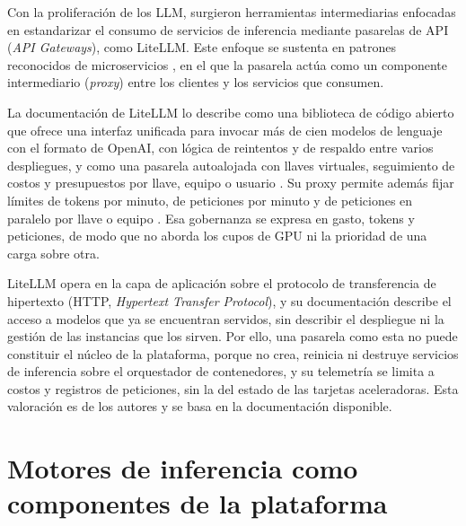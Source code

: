 Con la proliferación de los LLM, surgieron herramientas intermediarias enfocadas en estandarizar el consumo de servicios de inferencia mediante pasarelas de API (\emph{API Gateways}), como LiteLLM. Este enfoque se sustenta en patrones reconocidos de microservicios \citep{montesi-apigatewaypatterns-2016}, en el que la pasarela actúa como un componente intermediario (\emph{proxy}) entre los clientes y los servicios que consumen.

La documentación de LiteLLM lo describe como una biblioteca de código abierto que ofrece una interfaz unificada para invocar más de cien modelos de lenguaje con el formato de OpenAI, con lógica de reintentos y de respaldo entre varios despliegues, y como una pasarela autoalojada con llaves virtuales, seguimiento de costos y presupuestos por llave, equipo o usuario \citep{litellm-overview-2026}. Su proxy permite además fijar límites de tokens por minuto, de peticiones por minuto y de peticiones en paralelo por llave o equipo \citep{litellm-proxyusers-2026}. Esa gobernanza se expresa en gasto, tokens y peticiones, de modo que no aborda los cupos de GPU ni la prioridad de una carga sobre otra.

LiteLLM opera en la capa de aplicación sobre el protocolo de transferencia de hipertexto (HTTP, \emph{Hypertext Transfer Protocol}), y su documentación describe el acceso a modelos que ya se encuentran servidos, sin describir el despliegue ni la gestión de las instancias que los sirven. Por ello, una pasarela como esta no puede constituir el núcleo de la plataforma, porque no crea, reinicia ni destruye servicios de inferencia sobre el orquestador de contenedores, y su telemetría se limita a costos y registros de peticiones, sin la del estado de las tarjetas aceleradoras. Esta valoración es de los autores y se basa en la documentación disponible.

\section{Motores de inferencia como componentes de la plataforma}\label{sec:motores-inferencia}

